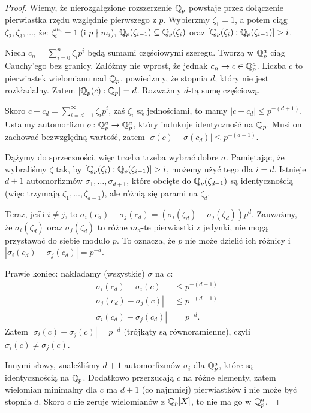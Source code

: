 \begin{proof}
	Wiemy, że nierozgałęzione rozszerzenie $\mathbb Q_p$ powstaje przez dołączenie pierwiastka rzędu względnie pierwszego z $p$.
	Wybierzmy $\zeta_1 = 1$, a potem ciąg $\zeta_2, \zeta_3, \dots$, że: $\zeta_i^{m_i} = 1$ (i $p \nmid m_i$), $\mathbb Q_p(\zeta_{i-1}) \subseteq \mathbb Q_p(\zeta_i)$ oraz $[\mathbb Q_p(\zeta_i) : \mathbb Q_p(\zeta_{i-1})] > i$.

	Niech $c_n =\sum_{i=0}^n \zeta_i p^i$ będą sumami częściowymi szeregu.
	Tworzą w $\mathbb Q_p^a$ ciąg Cauchy'ego bez granicy.
	Załóżmy nie wprost, że jednak $c_n \to c \in \mathbb Q_p^a$.
	Liczba $c$ to pierwiastek wielomianu nad $\mathbb Q_p$, powiedzmy, że stopnia $d$, który nie jest rozkładalny.
	Zatem $[\mathbb Q_p(c) : \mathbb Q_p] = d$.
	Rozważmy $d$-tą sumę częściową.

	Skoro $c - c_d = \sum_{i=d+1}^\infty \zeta_i p^i$, zaś $\zeta_i$ są jednościami, to mamy $|c - c_d| \le p^{-(d+1)}$.
	Ustalmy automorfizm $\sigma \colon {\mathbb Q}^a_p \to {\mathbb Q}_p^a$, który indukuje identyczność na $\mathbb Q_p$.
	Musi on zachować bezwzględną wartość, zatem $|\sigma(c) - \sigma(c_d) | \le p^{-(d+1)}$.

	Dążymy do sprzeczności, więc trzeba trzeba wybrać dobre $\sigma$.
	Pamiętając, że wybraliśmy $\zeta$ tak, by $[\mathbb Q_p (\zeta_i) : \mathbb Q_p(\zeta_{i-1})] >i$, możemy użyć tego dla  $i=d$.
	Istnieje $d+1$ automorfizmów $\sigma_1, \dots, \sigma_{d+1}$, które obcięte do $\mathbb Q_p(\zeta_{d-1})$ są identycznością (więc trzymają $\zeta_1, \dots, \zeta_{d-1}$), ale różnią się parami na $\zeta_d$.

	Teraz, jeśli $i \neq j$, to $\sigma_i(c_d) - \sigma_j(c_d) = (\sigma_i(\zeta_d) - \sigma_j(\zeta_d))p^d$. 
	Zauważmy, że $\sigma_i(\zeta_d)$ oraz $\sigma_j(\zeta_d)$ to różne $m_d$-te pierwiastki z jedynki, nie mogą przystawać do siebie modulo $p$.
	To oznacza, że $p$ nie może dzielić ich różnicy i $|\sigma_i(c_d) - \sigma_j(c_d)| = p^{-d}$.

	Prawie koniec: nakładamy (wszystkie) $\sigma$ na $c$:
	\begin{align*}
		|\sigma_i(c_d) - \sigma_i(c)| & \le p^{-(d+1)} \\
		|\sigma_j(c_d) - \sigma_j(c)| & \le p^{-(d+1)} \\
		|\sigma_i(c_d) - \sigma_j(c_d)| & = p^{-d}.
	\end{align*}
	Zatem $|\sigma_i(c) - \sigma_j(c)| = p^{-d}$ (trójkąty są równoramienne), czyli $\sigma_i (c) \neq \sigma_j(c)$.

	Innymi słowy, znaleźliśmy $d+1$ automorfizmów $\sigma_i$ dla ${\mathbb Q}^a_p$, które są identycznością na $\mathbb Q_p$.
	Dodatkowo przerzucają $c$ na różne elementy, zatem wielomian minimalny dla $c$ ma $d+1$ (co najmniej) pierwiastków i nie może być stopnia $d$.
	Skoro $c$ nie zeruje wielomianów z $\mathbb Q_p[X]$, to nie ma go w $\mathbb Q_p^a$.
\end{proof}

